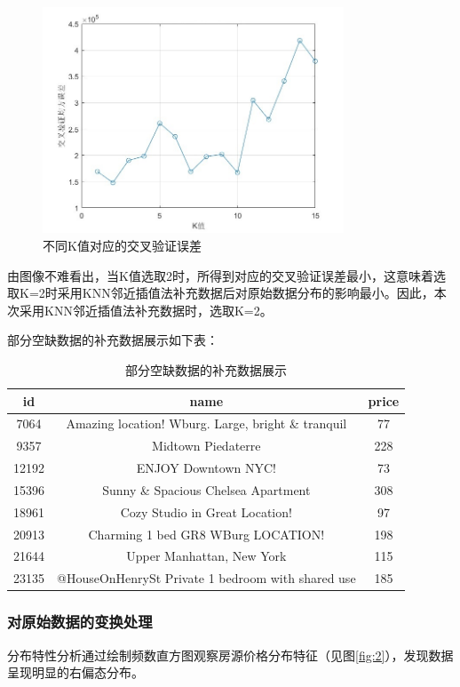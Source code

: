 \documentclass[12pt]{article}
\begin{document}
\begin{CJK}{UTF8}{gbsn}
		\begin{figure}[htbp]
		\centering
		\includegraphics[width=0.8\textwidth]{pic/1.jpg} %
		\caption{不同K值对应的交叉验证误差}
		\label{fig:1}
	\end{figure}
	
	由图像不难看出，当K值选取2时，所得到对应的交叉验证误差最小，这意味着选取K=2时采用KNN邻近插值法补充数据后对原始数据分布的影响最小。因此，本次采用KNN邻近插值法补充数据时，选取K=2。
	
	部分空缺数据的补充数据展示如下表：
	
	\begin{table}[H]
		\centering
		\begin{tabular}{ccc}
			\toprule
			id & name & price \\
			\midrule
			7064 & Amazing location! Wburg. Large, bright \& tranquil & 77 \\
			9357 & Midtown Piedaterre & 228 \\
			12192 & ENJOY Downtown NYC! & 73 \\
			15396 & Sunny \& Spacious Chelsea Apartment & 308 \\
			18961 & Cozy Studio in Great Location! & 97 \\
			20913 & Charming 1 bed GR8 WBurg LOCATION! & 198 \\
			21644 & Upper Manhattan, New York & 115 \\
			23135 & @HouseOnHenrySt Private 1 bedroom with shared use & 185 \\
			\bottomrule
		\end{tabular}
		\caption{部分空缺数据的补充数据展示}
		
	\end{table}
	
	
	\subsubsection{对原始数据的变换处理}
	分布特性分析通过绘制频数直方图观察房源价格分布特征（见图\ref{fig:2}），发现数据呈现明显的右偏态分布。
	

\end{CJK}
\end{document}
